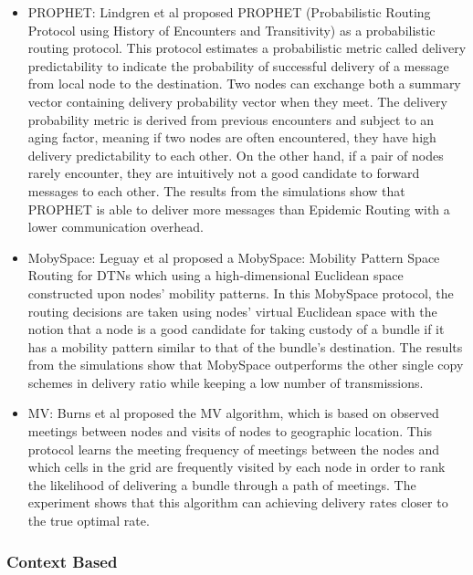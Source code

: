\label{bg:Opportunistic Networks:Classification of Opportunistic Routing:PB}
	\begin{itemize}
		\item PROPHET:
		Lindgren et al \cite{Lindgren2004} proposed PROPHET (Probabilistic Routing Protocol using History of Encounters and Transitivity) as a probabilistic routing protocol.
		This protocol estimates a probabilistic metric called delivery predictability to indicate the probability of successful delivery of a message from local node to the destination.
		Two nodes can exchange both a summary vector containing delivery probability vector when they meet.
		The delivery probability metric is derived from previous encounters and subject to an aging factor, meaning if two nodes are often encountered, they have high delivery predictability to each other.
		On the other hand, if a pair of nodes rarely encounter, they are intuitively not a good candidate to forward messages to each other.
		The results from the simulations show that PROPHET is able to deliver more messages than Epidemic Routing with a lower communication overhead.
		
		\item MobySpace:
		Leguay et al \cite{Leguay2005,Leguay2006} proposed a MobySpace: Mobility Pattern Space Routing for DTNs which using a high-dimensional Euclidean space constructed upon nodes' mobility patterns.
		In this MobySpace protocol, the routing decisions are taken using nodes’  virtual Euclidean space with the notion that a node is a good candidate for taking custody of a bundle if it has a mobility pattern similar to that of the bundle’s destination.
		The results from the simulations show that MobySpace outperforms the other single copy schemes in delivery ratio while keeping a low number of transmissions.

		\item MV:
		Burns et al \cite{Burns2005} proposed the MV algorithm, which is based on observed meetings between nodes and visits of nodes to geographic location.
		This protocol learns the meeting frequency of meetings between the nodes and which cells in the grid are frequently visited by each node in order to rank the likelihood of delivering a bundle through a path of meetings.
		The experiment shows that this algorithm can achieving delivery rates closer to the true optimal rate.
	\end{itemize}

\subsubsection{Context Based }
\label{bg:Opportunistic Networks:Classification of Opportunistic Routing:CXB}

